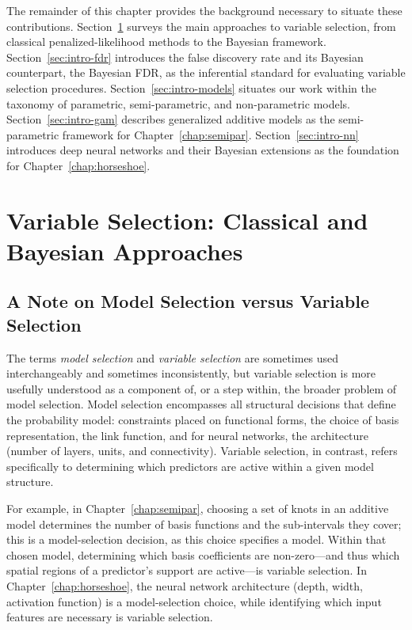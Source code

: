 The remainder of this chapter provides the background necessary to
situate these contributions. 
Section~\ref{sec:intro-vs} surveys the main
approaches to variable selection, from classical
penalized-likelihood methods to the Bayesian framework.
Section~\ref{sec:intro-fdr} introduces the false discovery rate and
its Bayesian counterpart, the Bayesian FDR, as the inferential standard for evaluating
variable selection procedures. 
Section~\ref{sec:intro-models}
situates our work within the taxonomy of parametric,
semi-parametric, and non-parametric models.
Section~\ref{sec:intro-gam} describes generalized additive models
as the semi-parametric framework for Chapter~\ref{chap:semipar}.
Section~\ref{sec:intro-nn} introduces deep neural networks and
their Bayesian extensions as the foundation for
Chapter~\ref{chap:horseshoe}. 

\section{Variable Selection: Classical and Bayesian Approaches}
\label{sec:intro-vs}


\subsection{A Note on Model Selection versus Variable Selection}
\label{subsec:modelvsvar}

The terms \emph{model selection} and \emph{variable selection} are
sometimes used interchangeably and sometimes inconsistently, but variable selection is more usefully understood as a
component of, or a step within, the broader problem of model
selection. Model selection encompasses all structural decisions
that define the probability model: constraints placed on functional forms, the choice of basis representation, the link function, and
for neural networks, the architecture (number of layers, units, and
connectivity). Variable selection, in contrast, refers specifically
to determining which predictors are active within a given model structure.

For example, in Chapter~\ref{chap:semipar}, choosing a set of knots in an additive model determines the number of basis functions
and the sub-intervals they cover; this is a model-selection
decision, as this choice specifies a model. Within that chosen model, determining which basis
coefficients are non-zero---and thus which spatial regions of a
predictor's support are active---is variable selection. In
Chapter~\ref{chap:horseshoe}, the neural network architecture
(depth, width, activation function) is a model-selection choice,
while identifying which input features are necessary is variable
selection.

